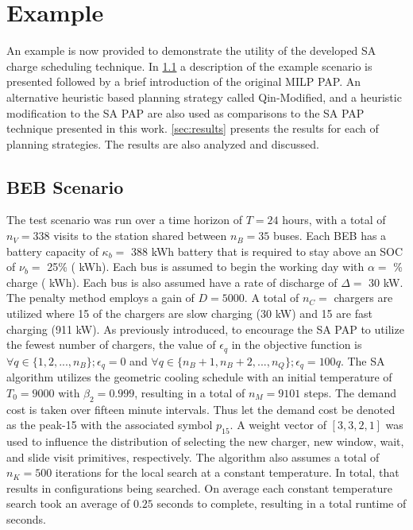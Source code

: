 \documentclass[ee,thesis]{usuthesis}
\newcommand{\A}{35 }                                                            %
\newcommand{\N}{338 }                                                           %
\newcommand{\Cgain}{5000}                                                       %
\newcommand{\acharge}{0.9 }                                                     %
\newcommand{\mincharge}{25\% }                                                  %
\newcommand{\minchargeD}{0.25 }                                                 %
\newcommand{\batsize}{388 }                                                     %
\newcommand{\fast}{15 }                                                         %
\newcommand{\slow}{15 }                                                         %
\newcommand{\fasts}{911 }                                                       %
\newcommand{\slows}{30 }                                                        %
\newcommand{\localcnt}{500 }                                                    %
\newcommand{\tempinit}{9000 }                                                   %
\newcommand{\tempcnt}{9101 }                                                    %
\newcommand{\quicklocal}{0.25 }                                                %
\begin{document}
\section{Example}
\label{sec:example}
An example is now provided to demonstrate the utility of the developed SA charge scheduling technique. In
\ref{sec:beb-scenario} a description of the example scenario is presented followed by a brief introduction of the original
MILP PAP. An alternative heuristic based planning strategy called Qin-Modified, and a heuristic modification to the SA
PAP are also used as comparisons to the SA PAP technique presented in this work. \ref{sec:results} presents the results for
each of planning strategies. The results are also analyzed and discussed.

\subsection{BEB Scenario}
\label{sec:beb-scenario}
The test scenario was run over a time horizon of \(T=24\) hours, with a total of \(n_V = \N\) visits to the station shared
between \(n_B = \A\) buses. Each BEB has a battery capacity of \(\kappa_b =\) \batsize kWh battery that is required to stay above
an SOC of \(\nu_b =\) \mincharge (\fpeval{\batsize * \minchargeD} kWh). Each bus is assumed to begin the working
day with \(\alpha =\) \fpeval{\acharge*100}\% charge (\fpeval{\acharge * \batsize} kWh). Each bus is also
assumed have a rate of discharge of \(\Delta =\) 30 kW. The penalty method employs a gain of \(D = \Cgain\). A total of \(n_C =\)
\fpeval{\fast + \slow} chargers are utilized where \slow of the chargers are slow charging (\slows kW) and
\fast are fast charging (\fasts kW). As previously introduced, to encourage the SA PAP to utilize the fewest number of
chargers, the value of \(\epsilon_q\) in the objective function is \(\forall q \in \{1,2,..., n_B \}; \epsilon_q = 0\) and \(\forall q \in \{n_B + 1, n_B +
2, ..., n_Q\}; \epsilon_q = 100q\). The SA algorithm utilizes the geometric cooling schedule with an initial temperature of \(T_0
= \tempinit\) with \(\beta_2 = 0.999\), resulting in a total of \(n_M = \tempcnt\) steps. The demand cost is taken over fifteen
minute intervals. Thus let the demand cost be denoted as the peak-15 with the associated symbol \(p_{15}\). A weight
vector of \([3, 3, 2, 1]\) was used to influence the distribution of selecting the new charger, new window, wait, and
slide visit primitives, respectively. The algorithm also assumes a total of \(n_K = \localcnt\) iterations for the local
search at a constant temperature. In total, that results in \fpeval{\localcnt * \tempcnt} configurations
being searched. On average each constant temperature search took an average of \(\quicklocal\) seconds to complete,
resulting in a total runtime of \fpeval{\quicklocal * \tempcnt} seconds.
\end{document}
